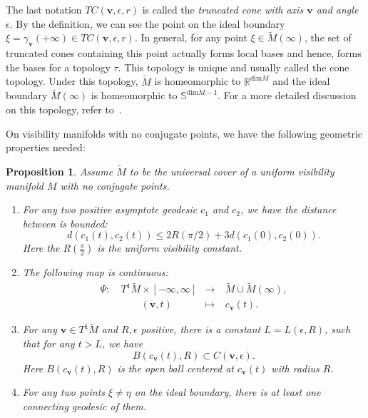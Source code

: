 \documentclass[reqno,11pt]{article}
\newtheorem{proposition}[theorem]{Proposition}
\theoremstyle{definition}
\theoremstyle{remark}
\numberwithin{equation}{section}
\begin{document}
The last notation $TC(\bm{v},\epsilon,r)$ is called the \emph{truncated cone with axis $\bm{v}$ and angle $\epsilon$}. By the definition, we can see the point on the ideal boundary $\xi=\gamma_{\bm{v}}(+\infty)\in TC(\bm{v},\epsilon,r)$. In general, for any point $\xi\in\widetilde{M}(\infty)$, the set of truncated cones containing this point actually forms local bases and hence, forms the bases for a topology $\tau$. This topology is unique and usually called the cone topology. Under this topology, $\widetilde{M}$ is homeomorphic to $\mathbb{R}^{\text{dim}M}$ and the ideal boundary $\widetilde{M}(\infty)$ is homeomorphic to $\mathbb{S}^{\text{dim}M-1}$. For a more detailed discussion on this topology, refer to~\cite{Eb3}.

On visibility manifolds with no conjugate points, we have the following geometric properties needed:

\begin{proposition}\label{prop_2_7}
	Assume $\widetilde{M}$ to be the universal cover of a uniform visibility manifold $M$ with no conjugate points.
	\begin{enumerate}
		\item\cite{LW} For any two positive asymptote geodesic $c_1$ and $c_2$, we have the distance between is bounded:
		\begin{displaymath}
		    d(c_1(t),c_2(t))\leq 2R(\pi/2)+3d(c_1(0),c_2(0)).	
		\end{displaymath}
        Here the $R(\frac{\pi}{2})$ is the uniform visibility constant.
		\item\cite{Eb1} The following map is continuous:
		\begin{displaymath}
			\begin{aligned}
				\Psi:~& T^1\widetilde{M}\times[-\infty,\infty] & \to     &~\widetilde{M}\cup\widetilde{M}(\infty), \\
				       & \qquad(\bm{v},t)                       & \mapsto &~c_{\bm{v}}(t).
			\end{aligned}
		\end{displaymath}
    \item For any $\bm{v}\in T^1{\widetilde{M}}$ and $R,\epsilon$ positive, there is a constant $L=L(\epsilon, R)$, such that for any $t>L$, we have
        \begin{displaymath}
            B(c_{\bm{v}}(t),R)\subset C(\bm{v},\epsilon).
        \end{displaymath}
        Here $B(c_{\bm{v}}(t),R)$ is the open ball centered at $c_{\bm{v}}(t)$ with radius $R$.
    \item\cite{Eb3} For any two points $\xi\neq\eta$ on the ideal boundary, there is at least one connecting geodesic of them. 
	\end{enumerate}
\end{proposition}
\end{document}
